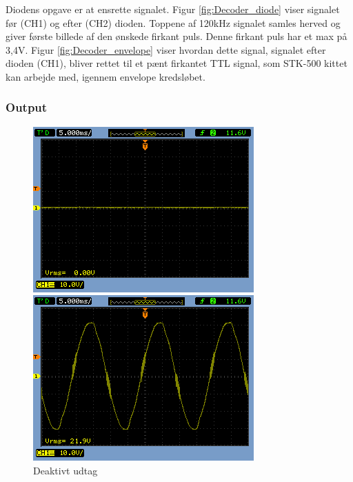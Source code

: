 Diodens opgave er at ensrette signalet. Figur \ref{fig:Decoder_diode} viser signalet før (CH1) og efter (CH2) dioden. Toppene af 120kHz signalet samles herved og giver første billede af den ønskede firkant puls. Denne firkant puls har et max på 3,4V. Figur \ref{fig:Decoder_envelope} viser hvordan dette signal, signalet efter dioden (CH1), bliver rettet til et pænt firkantet TTL signal, som STK-500 kittet kan arbejde med, igennem envelope kredsløbet. 
  

\subsubsection{Output}

\begin{figure}[H]
  \begin{minipage}{0.45\textwidth}
    \centering
	\includegraphics[width=\textwidth]{billeder/HWTest/Decoder/Decoder_relay_open}
		\caption{Deaktivt udtag}
	\label{fig:relay_open}
  \end{minipage}
  \hspace{0.1\textwidth}
  \begin{minipage}{0.45\textwidth}
    \centering
	\includegraphics[width=\textwidth]{billeder/HWTest/Decoder/Decoder_relay_closed}

\end{minipage}
\end{figure}
